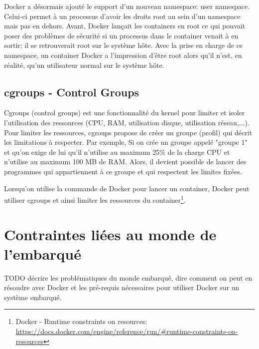 Docker a désormais ajouté le support d'un nouveau namespace: user namespace. Celui-ci permet à un processus d'avoir les droits root au sein d'un namespace mais pas en dehors. Avant, Docker lançait les containers en root ce qui pouvait poser des problèmes de sécurité si un processus dans le container venait à en sortir; il se retrouverait root sur le système hôte. Avec la prise en charge de ce namespace, un container Docker a l'impression d'être root alors qu'il n'est, en réalité, qu'un utilisateur normal sur le système hôte.

\subsection{cgroups - Control Groups}
Cgroups (control groups) est une fonctionnalité du kernel pour limiter et isoler l'utilisation des ressources (CPU, RAM, utilisation disque, utilisation réseau,...). Pour limiter les ressources, cgroups propose de créer un groupe (profil) qui décrit les limitations à respecter. Par exemple, Si on crée un groupe appelé "groupe 1" et qu'on exige de lui qu'il n'utilise au maximum 25\% de la charge CPU et n'utilise au maximum 100 MB de RAM. Alors, il devient possible de lancer des programmes qui appartiennent à ce groupe et qui respectent les limites fixées.

Lorsqu'on utilise la commande  de Docker pour lancer un container, Docker peut utiliser cgroups et ainsi limiter les ressources du container\footnote{Docker - Runtime constraints on resources: \url{https://docs.docker.com/engine/reference/run/\#runtime-constraints-on-resources}}.

\section{Contraintes liées au monde de l'embarqué}
TODO décrire les problématiques du monde embarqué, dire comment on peut en résoudre avec Docker et les pré-requis nécessaires pour utiliser Docker sur un système embarqué.